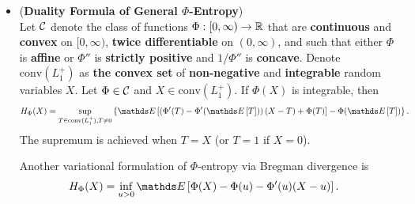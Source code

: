 \documentclass[11pt]{article}
\begin{document}
\begin{itemize}
\item \begin{theorem} \label{thm: duality_general_phi_entropy} (\textbf{Duality Formula of General $\Phi$-Entropy}) \citep{boucheron2013concentration}\\
Let ${\mathcal C}$ denote the class of functions $\Phi: [0, \infty) \to {\mathbb R}$ that are \textbf{continuous} and \textbf{convex} on $[0, \infty)$, \textbf{twice differentiable} on $(0, \infty)$, and such that either $\Phi$ is \textbf{affine} or $\Phi''$ is \textbf{strictly positive} and $1/\Phi''$ is \textbf{concave}. Denote $\text{conv}(L_{1}^{+})$ as \textbf{the convex set} of \textbf{non-negative} and \textbf{integrable} random variables $X$. Let $\Phi \in {\mathcal C}$ and $X \in \text{conv}(L_{1}^{+})$. If $\Phi(X)$ is integrable, then
\begin{align}
H_{\Phi}(X) &=  \sup_{T \in \text{conv}(L_{1}^{+}), T\neq 0}\set{\E{}{\paren{\Phi'(T) - \Phi'(\E{}{T})}(X-T) + \Phi(T)} - \Phi(\E{}{T})}.  \label{eqn: duality_phi_entropy_general}
\end{align} The supremum is achieved when $T=X$ (or $T=1$ if $X=0$).

Another variational formulation of $\Phi$-entropy via Bregman divergence is
\begin{align}
H_{\Phi}(X) &=  \inf_{u > 0}\E{}{\Phi(X) - \Phi(u) - \Phi'(u)(X - u)}.  \label{eqn: duality_phi_entropy_general_upper}
\end{align}
\end{theorem}

\end{itemize}
\end{document}
